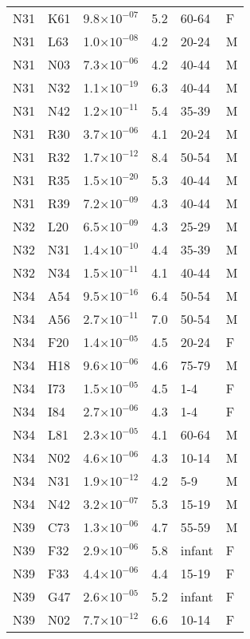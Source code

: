 \begin{longtable}{lllrll}
   N31 & K61 & 9.8$\times10^{-07}$ & 5.2 & 60-64 & F \\ 
   N31 & L63 & 1.0$\times10^{-08}$ & 4.2 & 20-24 & M \\ 
   N31 & N03 & 7.3$\times10^{-06}$ & 4.2 & 40-44 & M \\ 
   N31 & N32 & 1.1$\times10^{-19}$ & 6.3 & 40-44 & M \\ 
   N31 & N42 & 1.2$\times10^{-11}$ & 5.4 & 35-39 & M \\ 
   N31 & R30 & 3.7$\times10^{-06}$ & 4.1 & 20-24 & M \\ 
   N31 & R32 & 1.7$\times10^{-12}$ & 8.4 & 50-54 & M \\ 
   N31 & R35 & 1.5$\times10^{-20}$ & 5.3 & 40-44 & M \\ 
   N31 & R39 & 7.2$\times10^{-09}$ & 4.3 & 40-44 & M \\ 
   N32 & L20 & 6.5$\times10^{-09}$ & 4.3 & 25-29 & M \\ 
   N32 & N31 & 1.4$\times10^{-10}$ & 4.4 & 35-39 & M \\ 
   N32 & N34 & 1.5$\times10^{-11}$ & 4.1 & 40-44 & M \\ 
   N34 & A54 & 9.5$\times10^{-16}$ & 6.4 & 50-54 & M \\ 
   N34 & A56 & 2.7$\times10^{-11}$ & 7.0 & 50-54 & M \\ 
   N34 & F20 & 1.4$\times10^{-05}$ & 4.5 & 20-24 & F \\ 
   N34 & H18 & 9.6$\times10^{-06}$ & 4.6 & 75-79 & M \\ 
   N34 & I73 & 1.5$\times10^{-05}$ & 4.5 & 1-4 & F \\ 
   N34 & I84 & 2.7$\times10^{-06}$ & 4.3 & 1-4 & F \\ 
   N34 & L81 & 2.3$\times10^{-05}$ & 4.1 & 60-64 & M \\ 
   N34 & N02 & 4.6$\times10^{-06}$ & 4.3 & 10-14 & M \\ 
   N34 & N31 & 1.9$\times10^{-12}$ & 4.2 & 5-9 & M \\ 
   N34 & N42 & 3.2$\times10^{-07}$ & 5.3 & 15-19 & M \\ 
   N39 & C73 & 1.3$\times10^{-06}$ & 4.7 & 55-59 & M \\ 
   N39 & F32 & 2.9$\times10^{-06}$ & 5.8 & infant & F \\ 
   N39 & F33 & 4.4$\times10^{-06}$ & 4.4 & 15-19 & F \\ 
   N39 & G47 & 2.6$\times10^{-05}$ & 5.2 & infant & F \\ 
   N39 & N02 & 7.7$\times10^{-12}$ & 6.6 & 10-14 & F \\ 

\end{longtable}

